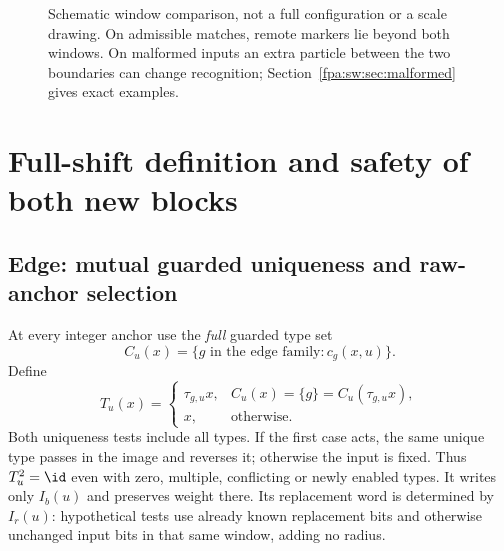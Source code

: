 \documentclass[11pt,a4paper]{article}
\numberwithin{equation}{section}
\begin{document}
\begin{figure}[htbp]\centering
{}
\caption{Schematic window comparison, not a full configuration or a scale drawing. On admissible matches, remote markers lie beyond both windows. On malformed inputs an extra particle between the two boundaries can change recognition; Section~\ref{fpa:sw:sec:malformed} gives exact examples.}
\end{figure}
\section{Full-shift definition and safety of both new blocks}\label{fpa:sw:sec:safety}
\subsection{Edge: mutual guarded uniqueness and raw-anchor selection}
At every integer anchor use the \emph{full} guarded type set
\[
C_u(x)=\{g\text{ in the edge family}:c_g(x,u)\}.
\]
Define
\begin{equation}\label{fpa:sw:eq:mutual}
T_u(x)=
\begin{cases}
\tau_{g,u}x,&C_u(x)=\{g\}=C_u(\tau_{g,u}x),\\
x,&\text{otherwise}.
\end{cases}
\end{equation}
Both uniqueness tests include all types. If the first case acts, the same unique type passes in the image and reverses it; otherwise the input is fixed. Thus $T_u^2=\id$ even with zero, multiple, conflicting or newly enabled types. It writes only $I_b(u)$ and preserves weight there. Its replacement word is determined by $I_r(u)$: hypothetical tests use already known replacement bits and otherwise unchanged input bits in that same window, adding no radius.
\end{document}

